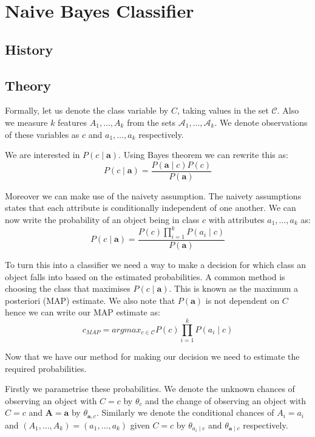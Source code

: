 \chapter{Naive Bayes Classifier}

\section{History}

\section{Theory}

Formally, let us denote the class variable by $C$, taking values in the set $\mathcal{C}$.
Also we measure $k$ features $A_1,\dots,A_k$ from the sets $\mathcal{A}_1,\dots,\mathcal{A}_k$.
We denote observations of these variables as $c$ and $a_1,\dots,a_k$ respectively.

We are interested in $P(c \mid \mathbf{a})$.
Using Bayes theorem we can rewrite this as:
\begin{equation}
	P(c \mid \mathbf{a}) = \frac{P(\mathbf{a} \mid c)P(c)}{P(\mathbf{a})}
\end{equation}

Moreover we can make use of the naivety assumption.
The naivety assumptions states that each attribute is conditionally independent of one another.
We can now write the probability of an object being in class $c$ with attributes $a_1,\dots,a_k$ as:
\begin{equation}
	P(c \mid \mathbf{a}) = \frac{P(c)\prod_{i=1}^{k}P(a_i \mid c)}{P(\mathbf{a})}
\end{equation}

To turn this into a classifier we need a way to make a decision for which class an object falls into based on the estimated probabilities.
A common method is choosing the class that maximises $P(c \mid \mathbf{a})$.
This is known as the maximum a posteriori (MAP) estimate.
We also note that $P(\mathbf{a})$ is not dependent on $C$ hence we can write our MAP estimate as:
\begin{equation}
	c_{MAP} = argmax_{c \in \mathcal{C}} P(c)\prod_{i=1}^{k}P(a_i \mid c)
\end{equation}

Now that we have our method for making our decision we need to estimate the required probabilities.

Firstly we parametrise these probabilities.
We denote the unknown chances of observing an object with $C=c$ by $\theta_c$ and the change of observing an object with $C=c$ and $\mathbf{A} = \mathbf{a}$ by $\theta_{\mathbf{a}, c}$.
Similarly we denote the conditional chances of $A_i=a_i$ and $(A_1,\dots,A_k)=(a_1,\dots,a_k)$ given $C=c$ by $\theta_{a_i \mid c}$ and $\theta_{\mathbf{a} \mid c}$ respectively.

